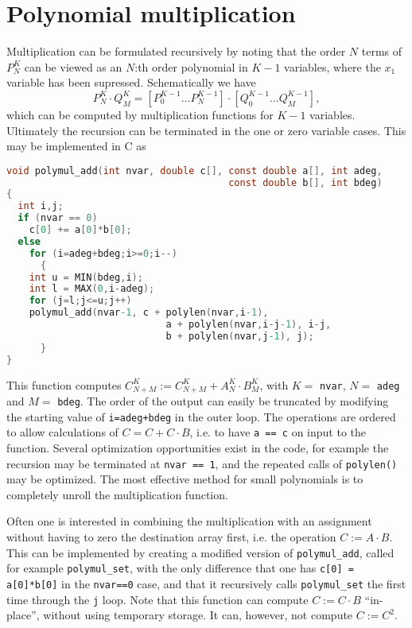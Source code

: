 \documentclass[11pt]{amsart}
\begin{document}
\section{Polynomial multiplication}
Multiplication can be formulated recursively by noting
that the order $N$ terms of $P_N^K$ can be viewed as an $N$:th order
polynomial in $K-1$ variables, where the $x_1$ variable has been supressed. Schematically we have
\begin{equation}
  P_N^K\cdot Q_M^K = \left[P_{0}^{K-1} \ldots P_N^{K-1}\right]\cdot\left[Q_{0}^{K-1} \ldots Q_M^{K-1}\right],
\end{equation}
which can be computed by multiplication functions for $K-1$
variables. Ultimately the recursion can be terminated in the one or
zero variable cases. This may be implemented in C as
\begin{lstlisting}[language=C]
void polymul_add(int nvar, double c[], const double a[], int adeg, 
                                       const double b[], int bdeg) 
{
  int i,j;
  if (nvar == 0)
    c[0] += a[0]*b[0];
  else
    for (i=adeg+bdeg;i>=0;i--)
      {
	int u = MIN(bdeg,i);
	int l = MAX(0,i-adeg);
	for (j=l;j<=u;j++)
	polymul_add(nvar-1, c + polylen(nvar,i-1), 
                            a + polylen(nvar,i-j-1), i-j, 
                            b + polylen(nvar,j-1), j);
      }
}
\end{lstlisting}
This function computes $C^K_{N+M} := C^K_{N+M} + A_N^K\cdot B^K_M$,
with $K =$ \texttt{nvar}, $N =$ \texttt{adeg} and $M
=$ \texttt{bdeg}. The order of the output can easily be truncated by
modifying the starting value of \texttt{i=adeg+bdeg} in the outer
loop. The operations are ordered to allow calculations of $C = C +
C\cdot B$, i.e. to have \texttt{a == c} on input to the function.
Several optimization opportunities exist in the code, for example the
recursion may be terminated at \texttt{nvar == 1}, and the repeated calls
of \texttt{polylen()} may be optimized. The most effective method for small
polynomials is to completely unroll the multiplication function.

Often one is interested in combining the multiplication with an
assignment without having to zero the destination array first,
i.e. the operation $C := A\cdot B$. This can be implemented by
creating a modified version of \texttt{polymul\_add}, called for
example \texttt{polymul\_set}, with the only difference that one has
\texttt{c[0] = a[0]*b[0]} in the \texttt{nvar==0} case, and that it
recursively calls \texttt{polymul\_set} the first time through the
\texttt{j} loop. Note that this function can compute $C:=C\cdot B$
``in-place'', without using temporary storage. It can, however, not compute $C:= C^2$.
\end{document}

